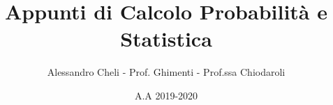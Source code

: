 \documentclass[a4paper,12pt]{book}
\begin{document}
\author{Alessandro Cheli - Prof. Ghimenti - Prof.ssa Chiodaroli}
\title{Appunti di Calcolo Probabilità e Statistica}
\date{A.A 2019-2020}

\frontmatter
\maketitle
\tableofcontents

\mainmatter




\backmatter
\end{document}
